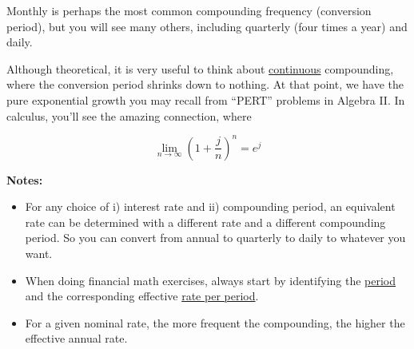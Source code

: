 \documentclass[14pt]{extarticle}
\begin{document}
Monthly is perhaps the most common compounding frequency (conversion period), but you will see many others, including quarterly (four times a year) and
daily.

Although theoretical, it is very useful to think about \underline{continuous} compounding, where the conversion
period shrinks down to nothing.  At that point, we have the pure exponential growth you may recall from ``PERT''
problems in Algebra II.  In calculus, you'll see the amazing connection, where

\[
  \lim_{n \to \infty} (1+\frac{j}{n})^n = e^j
\]

\textbf{Notes:}

\begin{itemize}

\item For any choice of i) interest rate and ii) compounding period, an equivalent rate can be determined
with a different rate and a different compounding period. So you can convert from annual to
quarterly to daily to whatever you want.
\item When doing financial math exercises, always start by identifying the \underline{period} and
the corresponding effective \underline{rate per period}.
\item For a given nominal rate, the more frequent the compounding, the higher the effective annual rate.

\end{itemize}
\end{document}
